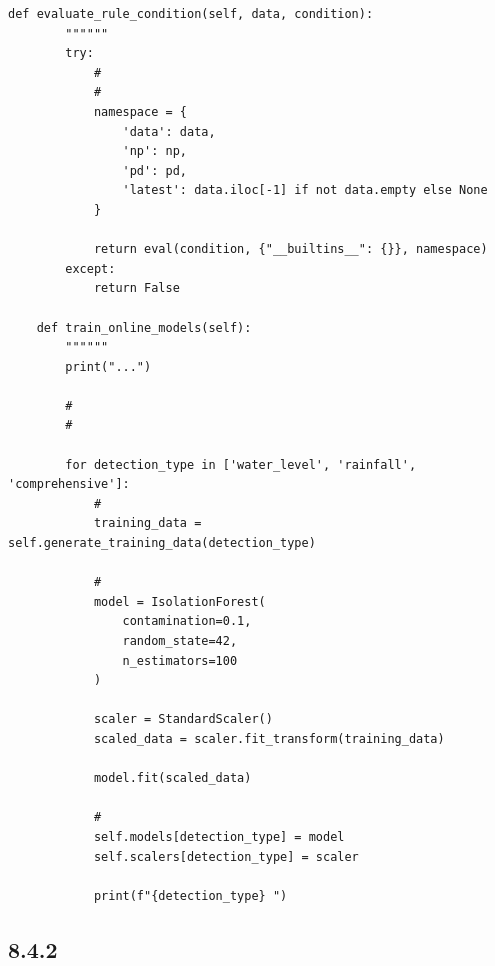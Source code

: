 \begin{lstlisting}[style=python]
    def evaluate_rule_condition(self, data, condition):
        """"""
        try:
            # 
            # 
            namespace = {
                'data': data,
                'np': np,
                'pd': pd,
                'latest': data.iloc[-1] if not data.empty else None
            }
            
            return eval(condition, {"__builtins__": {}}, namespace)
        except:
            return False
    
    def train_online_models(self):
        """"""
        print("...")
        
        # 
        # 
        
        for detection_type in ['water_level', 'rainfall', 'comprehensive']:
            # 
            training_data = self.generate_training_data(detection_type)
            
            # 
            model = IsolationForest(
                contamination=0.1,
                random_state=42,
                n_estimators=100
            )
            
            scaler = StandardScaler()
            scaled_data = scaler.fit_transform(training_data)
            
            model.fit(scaled_data)
            
            # 
            self.models[detection_type] = model
            self.scalers[detection_type] = scaler
            
            print(f"{detection_type} ")
\end{lstlisting}

\hypertarget{section-107}{%
\subsection{8.4.2}\label{section-107}}

\hypertarget{section-108}{%
\subsubsection{}\label{section-108}}

